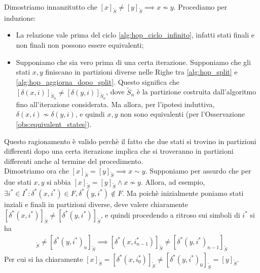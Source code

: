 \begin{proof2}
    Dimostriamo innanzitutto che $[x]_{\widetilde{S}} \neq [y]_{\widetilde{S}} \implies x \not\sim y$. Procediamo per induzione:
    \begin{itemize}
        \item La relazione vale prima del ciclo \ref{alg:hop_ciclo_infinito}, infatti stati finali e non finali non possono essere equivalenti;
        \item Supponiamo che sia vero prima di una certa iterazione. Supponiamo che gli stati $x,y$ finiscano in partizioni diverse nelle Righe tra \ref{alg:hop_split} e \ref{alg:hop_aggiorna_dopo_split}. Questo significa che $[\delta(x,i)]_{\widetilde{S}_n} \neq [\delta(y,i)]_{\widetilde{S}_n}$, dove $\widetilde{S}_n$ è la partizione costruita dall'algoritmo fino all'iterazione considerata. Ma allora, per l'ipotesi induttiva, $\delta(x,i) \not\sim \delta(y,i)$, e quindi $x,y$ non sono equivalenti (per l'Osservazione \ref{obs:equivalent_states}).
    \end{itemize}
    Questo ragionamento è valido perchè il fatto che due stati si trovino in partizioni differenti dopo una certa iterazione implica che si troveranno in partizioni differenti anche al termine del procedimento.\\
    Dimostriamo ora che $[x]_{\widetilde{S}} = [y]_{\widetilde{S}} \implies x \sim y$. Supponiamo per assurdo che per due stati $x,y$ si abbia $[x]_{\widetilde{S}} = [y]_{\widetilde{S}} \land x \not\sim y$. Allora, ad esempio, $\exists i^* \in I^* : \delta^*(x,i^*) \in F, \delta^*(y,i^*) \not\in F$. Ma poichè inizialmente poniamo stati inziali e finali in partizioni diverse, deve valere chiaramente $[\delta^*(x,i^*)]_{\widetilde{S}} \neq [\delta^*(y,i^*)]_{\widetilde{S}}$, e quindi procedendo a ritroso sui simboli di $i^*$ si ha
    \begin{gather*}
        [\delta^*(x,i^*_n)]_{\widetilde{S}} \neq [\delta^*(y,i^*)_n]_{\widetilde{S}} \implies [\delta^*(x,i^*_{n-1})]_{\widetilde{S}} \neq [\delta^*(y,i^*)_{n-1}]_{\widetilde{S}}
    \end{gather*}
    Per cui si ha chiaramente $[x]_{\widetilde{S}} = [\delta^*(x,i^*_0)]_{\widetilde{S}} \neq [\delta^*(y,i^*)_0]_{\widetilde{S}} = [y]_{\widetilde{S}}$.
\end{proof2}
